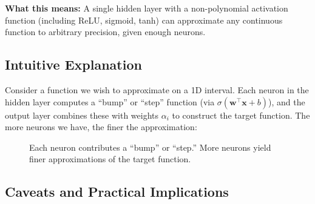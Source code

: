 \textbf{What this means:} A single hidden layer with a non-polynomial activation function (including ReLU, sigmoid, tanh) can approximate any continuous function to arbitrary precision, given enough neurons.

\subsection{Intuitive Explanation}

Consider a function we wish to approximate on a 1D interval. Each neuron in the hidden layer computes a ``bump'' or ``step'' function (via $\sigma(\mathbf{w}^\top \mathbf{x} + b)$), and the output layer combines these with weights $\alpha_i$ to construct the target function. The more neurons we have, the finer the approximation:

\begin{figure}[htbp]
    \centering
    \caption[Intuition behind universal approximation]{Each neuron contributes a ``bump'' or ``step.'' More neurons yield finer approximations of the target function.}
    \label{fig:uat_intuition}
\end{figure}

\subsection{Caveats and Practical Implications}

